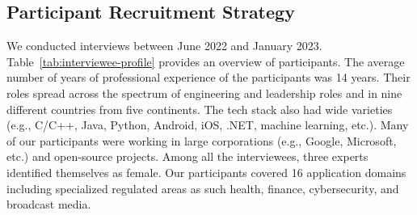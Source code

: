 \subsection{Participant Recruitment Strategy}
We conducted \numInterviews interviews between June 2022 and January 2023. Table~\ref{tab:interviewee-profile} provides an overview of participants.
The average number of years of professional experience of the participants was 14 years. Their roles spread across the spectrum of engineering and leadership roles and in nine different countries from five continents. The tech stack also had wide varieties (e.g., C/C++, Java, Python, Android, iOS, .NET, machine learning, etc.). Many of our participants were working in large corporations (e.g., Google, Microsoft, etc.) and open-source projects. Among all the interviewees, three experts identified themselves as female. Our participants covered 16 application domains including specialized regulated areas as such health, finance, cybersecurity, and broadcast media. 




